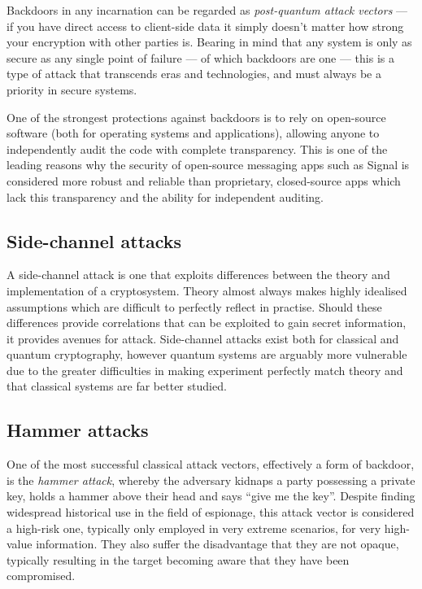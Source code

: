 Backdoors in any incarnation can be regarded as \emph{post-quantum attack vectors} --- if you have direct access to client-side data it simply doesn't matter how strong your encryption with other parties is. Bearing in mind that any system is only as secure as any single point of failure --- of which backdoors are one --- this is a type of attack that transcends eras and technologies, and must always be a priority in secure systems.

One of the strongest protections against backdoors is to rely on open-source software (both for operating systems and applications), allowing anyone to independently audit the code with complete transparency. This is one of the leading reasons why the security of open-source messaging apps such as Signal is considered more robust and reliable than proprietary, closed-source apps which lack this transparency and the ability for independent auditing.

\subsection{Side-channel attacks} \label{side-channel-attacks}

A side-channel attack is one that exploits differences between the theory and implementation of a cryptosystem. Theory almost always makes highly idealised assumptions which are difficult to perfectly reflect in practise. Should these differences provide correlations that can be exploited to gain secret information, it provides avenues for attack. Side-channel attacks exist both for classical and quantum cryptography, however quantum systems are arguably more vulnerable due to the greater difficulties in making experiment perfectly match theory and that classical systems are far better studied.

\subsection{Hammer attacks} \label{hammer-attacks}

One of the most successful classical attack vectors, effectively a form of backdoor, is the \emph{hammer attack}, whereby the adversary kidnaps a party possessing a private key, holds a hammer above their head and says ``give me the key''. Despite finding widespread historical use in the field of espionage, this attack vector is considered a high-risk one, typically only employed in very extreme scenarios, for very high-value information. They also suffer the disadvantage that they are not opaque, typically resulting in the target becoming aware that they have been compromised.

